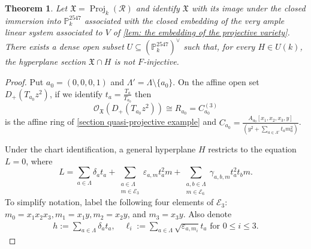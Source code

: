 \documentclass[reqno,11pt]{amsart}
\numberwithin{equation}{section}
\newtheorem{theorem}{Theorem}[section]
\theoremstyle{definition}
\theoremstyle{definition}
\theoremstyle{definition}
\theoremstyle{remark}
\newcommand{\Proj}{\operatorname{Proj}}
\newcommand{\PP}{\mathbb{P}}
\newcommand{\cO}{\mathcal{O}}
\begin{document}
\begin{theorem}
\label{theorem: the embedding, F-rationality, failure of Bertini}
Let $\mathfrak{X}=\Proj_k(\mathcal R)$ and identify $\mathfrak{X}$ with its image
under the closed immersion into $\PP_k^{2547}$ associated with the closed embedding of the very ample linear system associated to $V$ of \cref{lem: the embedding of the projective variety}. There exists a dense open subset $U\subseteq(\PP_k^{2547})^\vee$ such that, for every $H\in U(k)$, the hyperplane section $\mathfrak{X}\cap H$ is not $F$-injective.
\end{theorem}
\begin{proof}
    Put $a_0=(0,0,0,1)$ and
    $\Lambda'=\Lambda\setminus\{a_0\}$. On the affine open set
    $D_+(T_{a_0}z^2)$, if we identify $t_a = \frac{T_a}{T_{a_0}}$ then 
    \[
        \cO_\mathfrak{X}(D_+(T_{a_0}z^2))
        \cong R_{a_0}=C_{a_0}^{(3)}
    \]
    is the affine ring of \cref{section quasi-projective example} and $C_{a_0} = \frac{A_{a_0}[x_1,x_2,x_3,y]}{(y^2 + \sum_{a\in\Lambda'}t_am_a^2)}$.

    
    Under the chart identification, a general hyperplane $H$ restricts to the equation $L=0$, where
    \[
        L=\sum_{a\in\Lambda}\delta_a t_a + \sum_{\substack{a\in\Lambda\\m\in\mathcal{E}_3}} \varepsilon_{a,m}t_a^2m+\sum_{\substack{a,b\in\Lambda\\m\in\mathcal{E}_6}} \gamma_{a,b,m}t_a^2t_bm.
    \]
    To simplify notation, label the following four elements of $\mathcal{E}_3$: $m_0 = x_1x_2x_3, m_1 = x_1y, m_2 = x_2y$, and $m_3 = x_3y$. Also denote
\begin{align*}
    h := \sum_{a\in\Lambda}\delta_a t_a,\quad \ell_i:=\sum_{a\in\Lambda} \sqrt{\varepsilon_{a,m_i}}t_a\text{ for }0\leq i\leq 3.
\end{align*}


\end{proof}
\end{document}
